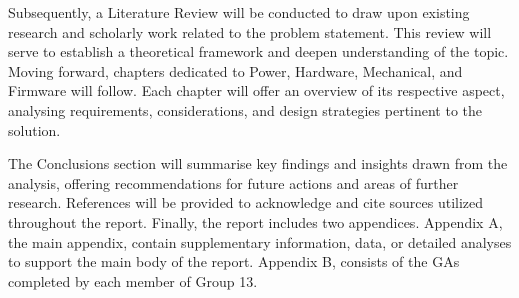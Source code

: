 \documentclass[class=report,11pt,crop=false]{standalone}
\begin{document}
Subsequently, a Literature Review will be conducted to draw upon existing research and scholarly work related to the problem statement. This review will serve to establish a theoretical framework and deepen understanding of the topic. Moving forward, chapters dedicated to Power, Hardware, Mechanical, and Firmware will follow. Each chapter will offer an overview of its respective aspect, analysing requirements, considerations, and design strategies pertinent to the solution.
\newline

The Conclusions section will summarise key findings and insights drawn from the analysis, offering recommendations for future actions and areas of further research. References will be provided to acknowledge and cite sources utilized throughout the report.
\newline
Finally, the report includes two appendices. Appendix A, the main appendix, contain supplementary information, data, or detailed analyses to support the main body of the report. Appendix B, consists of the GAs completed by each member of Group 13.


\ifstandalone

\printnoidxglossary[type=\acronymtype,nonumberlist]
\fi
\end{document}
